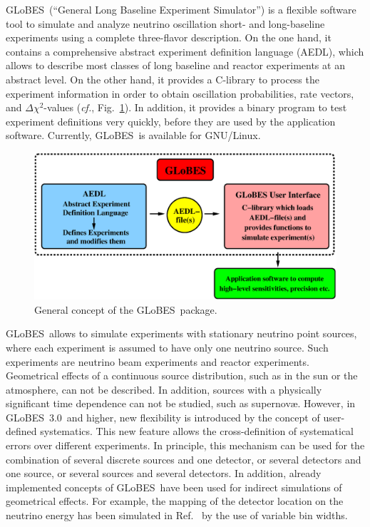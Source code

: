 \documentclass[12pt,a4paper]{article}
\newcommand{\capdef}{}
\newcommand{\mycaption}[2][\capdef]{\renewcommand{\capdef}{#2}%
       \caption[#1]{{\footnotesize #2}}}
\newcommand{\cf}{{\it cf.}}
\newcommand{\fig}{Fig.}
\newcommand{\Ref}{Ref.}
\newcommand{\GLOBES}{{\sf GLoBES}}
\newcommand{\GLOBESN}{{\sf GLoBES~3.0}}
\newcommand{\AEDL}{{\sf AEDL}}
\newcommand{\figu}[1]{\fig~\ref{fig:#1}}
\begin{document}
\GLOBES\ (``General Long Baseline Experiment Simulator'') is a flexible
software tool to simulate and analyze neutrino oscillation 
short- and long-baseline experiments using a 
complete three-flavor description. On the
one hand, it contains a comprehensive abstract experiment definition
language (\AEDL ), which allows to describe 
most classes of long baseline and reactor experiments
at an abstract level. On the other hand, it provides a C-library to 
process the experiment information in order to obtain oscillation
probabilities, rate vectors, and $\Delta \chi^2$-values (\cf, \figu{GLOBES}). 
In addition, it provides a binary program to test experiment
definitions very quickly, before they are used by the application software.
Currently, \GLOBES\ is available for GNU/Linux. 

\begin{figure}[t]
\begin{center}
\includegraphics[width=14cm]{GLOBES}
\end{center}
\mycaption{\label{fig:GLOBES} General concept of the \GLOBES\ package.}
\end{figure}

\GLOBES\ allows to simulate experiments with stationary neutrino point 
sources, where each experiment is assumed to have only one neutrino source.
Such experiments are neutrino beam experiments and reactor experiments. 
Geometrical effects of a continuous source distribution, such as in the sun or the 
atmosphere, can not be described. In addition, sources with a physically 
significant time dependence can not be studied, such as  supernov\ae. 
However, in \GLOBESN\ and higher, new flexibility is introduced by the
concept of user-defined systematics. This new feature allows the cross-definition
of systematical errors over different experiments. In principle, 
this mechanism can be used for the combination of several discrete sources
and one detector, or several detectors and one source, or several sources and
several detectors. In addition, already implemented
concepts of \GLOBES\ have been used for indirect simulations of geometrical
effects. For example, the mapping of the detector location on the neutrino
energy has been simulated in \Ref~\cite{Rolinec:2006xr} by the use of
variable bin widths.
\end{document}
